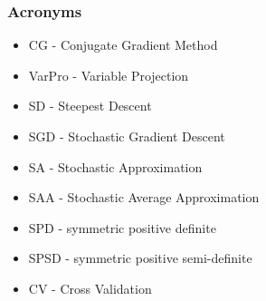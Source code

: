 \documentclass[12pt,fleqn]{beamer}
\begin{document}
\begin{frame}
	\frametitle{Acronyms}
	\begin{itemize}
		\item CG - Conjugate Gradient Method
		\item VarPro - Variable Projection
		\item SD - Steepest Descent
		\item SGD - Stochastic Gradient Descent
		\item SA  - Stochastic Approximation
		\item SAA - Stochastic Average Approximation
		\item SPD - symmetric positive definite
		\item SPSD - symmetric positive semi-definite
		\item CV - Cross Validation
	\end{itemize}
\end{frame}
\end{document}
